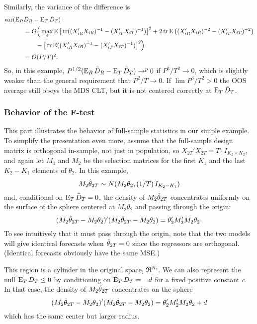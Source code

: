 \documentclass[12pt,draft]{article}
\begin{document}
Similarly, the variance of the difference is
\begin{align*}
  \operatorname{var}(\operatorname{E}_R & \bar{D}_{R} - \operatorname{E}_T \bar{D}_{T}) \\ &=
  O\Big(\max_i \operatorname{E}\big[\operatorname{tr}((X_{iR}'X_{iR})^{-1} - (X_{iT}'X_{iT})^{-1})\big]^2
  + 2 \operatorname{tr} \operatorname{E}\big((X_{iR}'X_{iR})^{-2} - (X_{iT}'X_{iT})^{-2}\big) \\
  &\qquad - \big[\operatorname{tr} \operatorname{E}((X_{iR}'X_{iR})^{-1} - (X_{iT}'X_{iT})^{-1}) \big]^2 \Big)\\
  &= O(P/T)^2.
\end{align*}
So, in this example, $P^{1/2}(\operatorname{E}_R \bar{D}_{R} - \operatorname{E}_T \bar{D}_{T}) \to^p 0$
if $P^3/T^2 \to 0$, which is slightly weaker than the general
requirement that $P^2/T \to 0$.  If $\lim P^3/T^2 > 0$ the OOS average
still obeys the MDS CLT, but it is not centered correctly at $\operatorname{E}_T
\bar{D}_{T}$.

\subsubsection*{Behavior of the F-test}

This part illustrates the behavior of full-sample statistics in our
simple example. To simplify the presentation even more, assume that
the full-sample design matrix is orthogonal in-sample, not just in
population, so $X_{2T}'X_{2T} = T \cdot I_{K_2 \times K_2}$, and again
let $M_1$ and $M_2$ be the selection matrices for the first $K_1$ and
the last $K_2-K_1$ elements of $\theta_2$. In this example,
\begin{equation*}
  M_2 \hat\theta_{2T} \sim
  N(M_2 \theta_2, (1/T) \, I_{K_2-K_1})
\end{equation*}
and, conditional on $\operatorname{E}_T \bar{D}_{T} = 0$, the density of $M_2 \hat\theta_{2T}$
concentrates uniformly on the surface of the sphere centered at $M_2
\theta_2$ and passing through the origin:
\begin{equation*}
  (M_2 \hat\theta_{2T} - M_2 \theta_2)'(M_2 \hat\theta_{2T} - M_2 \theta_2) =
  \theta_2'M_2' M_2 \theta_2.
\end{equation*}
To see intuitively that it must pass through the origin, note that the
two models will give identical forecasts when $\hat\theta_{2T} = 0$ since the
regressors are orthogonal. (Identical forecasts obviously have the
same MSE.)

This region is a cylinder in the original space, $\Re^{K_2}$.  We can
also represent the null $\operatorname{E}_T \bar{D}_{T} \leq 0$ by conditioning on $\operatorname{E}_T
\bar{D}_{T} = -d$ for a fixed positive constant $c$. In that case, the
density of $M_2 \hat\theta_{2T}$ concentrates on the sphere
\begin{equation*}
  (M_2 \hat\theta_{2T} - M_2 \theta_2)'(M_2 \hat\theta_{2T} - M_2 \theta_2) =
  \theta_2'M_2' M_2 \theta_2 + d
\end{equation*}
which has the same center but larger radius.
\end{document}

